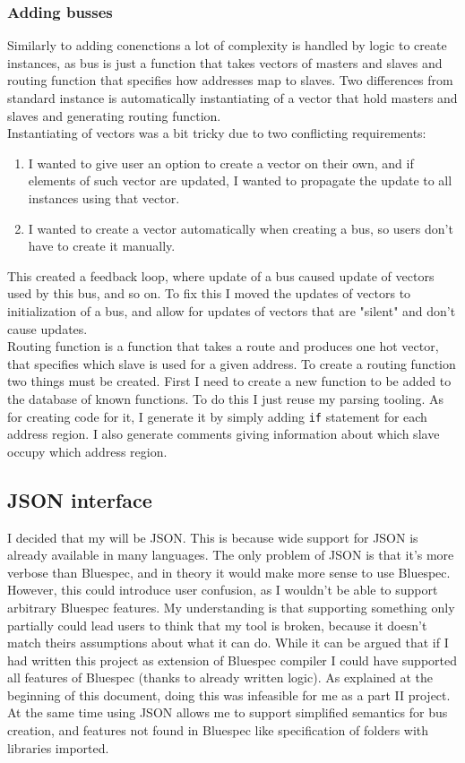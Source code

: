 \documentclass[14pt]{report}
\begin{document}
\subsubsection{Adding busses}
Similarly to adding conenctions a lot of complexity is handled by logic to create instances, as bus is just a function that takes vectors of masters and slaves and routing function that specifies how addresses map to slaves. Two differences from standard instance is automatically instantiating of a vector that hold masters and slaves and generating routing function. \\
Instantiating of vectors was a bit tricky due to two conflicting requirements:
\begin{enumerate}
    \item I wanted to give user an option to create a vector on their own, and if elements of such vector are updated, I wanted to propagate the update to all instances using that vector.
    \item I wanted to create a vector automatically when creating a bus, so users don't have to create it manually.
\end{enumerate} 
This created a feedback loop, where update of a bus caused update of vectors used by this bus, and so on. To fix this I moved the updates of vectors to initialization of a bus, and allow for updates of vectors that are "silent" and don't cause updates. 
\\
Routing function is a function that takes a route and produces one hot vector, that specifies which slave is used for a given address. 
To create a routing function two things must be created. First I need to create a new function to be added to the database of known functions. To do this I just reuse my parsing tooling. As for creating code for it, I generate it by simply adding \verb!if! statement for each address region. I also generate comments giving information about which slave occupy which address region.

\subsection*{JSON interface}
I decided that my  will be JSON. This is because wide support for JSON is already available in many languages. 
The only problem of JSON is that it's more verbose than Bluespec, and in theory it would make more sense to use Bluespec. 
However, this could introduce user confusion, as I wouldn't be able to support arbitrary Bluespec features.
My understanding is that supporting something only partially could lead users to think that my tool is broken, because it doesn't match theirs assumptions about what it can do. 
While it can be argued that if I had written this project as extension of Bluespec compiler I could have supported all features of Bluespec (thanks to already written logic). 
As explained at the beginning of this document, doing this was infeasible for me as a part II project. 
At the same time using JSON allows me to support simplified semantics for bus creation, and features not found in Bluespec like specification of folders with libraries imported.
\end{document}
